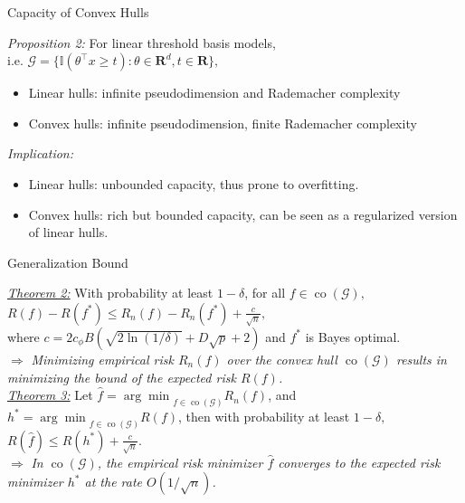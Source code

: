 \documentclass[11pt, xcolor={dvipsnames}]{beamer}
\newcommand{\setG}{{\mathcal G}}
\newcommand{\I}{{\mathbb I}}
\newcommand{\realnum}{{\mathbf R}}
\newcommand{\argmin}{{\arg\min}}
\DeclareMathOperator{\conv}{co}
\begin{document}
\begin{frame}{Capacity of Convex Hulls}

\emph{Proposition 2:} For linear threshold basis models, \\
\hspace{2.5cm}i.e. $ \setG = \{\I(\theta^{\top} x \ge t): \theta \in \realnum^{d}, t \in \realnum\},$
\begin{itemize} 
\item Linear hulls: infinite pseudodimension and Rademacher complexity
\item Convex hulls: infinite pseudodimension, finite Rademacher complexity 
\end{itemize}
\vspace{0.5cm}

\emph{Implication:} 
\begin{itemize} 
\item Linear hulls: unbounded capacity, thus prone to overfitting.
\item Convex hulls: rich but bounded capacity, can be seen as a regularized version of linear hulls.
\end{itemize}

\end{frame}

\begin{frame}{Generalization Bound}

\emph{\underline{Theorem 2:}} 	With probability at least $1 - \delta$, for all $f \in \conv(\setG),$ \\
\hspace{2.5cm}$R(f) - R(f^{*}) \le R_{n} (f) - R_{n}(f^{*}) + \frac{c}{\sqrt{n}},$ \\
where 
$c = {2 c_{\phi} B \left(\sqrt{2 \ln(1/\delta)} + D\sqrt{p} + 2\right)}$ 
and $f^*$ is Bayes optimal.
\vspace{0.2cm}\\
$\Longrightarrow$ \emph{Minimizing empirical risk $R_n(f)$ over the convex hull $\conv(\setG)$ results in minimizing the bound of the expected risk $R(f)$.}
\vspace{0.5cm}\\

\emph{\underline{Theorem 3:}} Let $\hat{f} = \argmin_{f \in \conv(\setG)} R_{n}(f)$, and $h^{*} = \argmin_{f \in \conv(\setG)} R(f)$, 
then with probability at least $1 - \delta,$
\hspace{0.2cm} $R(\hat{f}) \le R(h^{*}) + \frac{c}{\sqrt{n}}.$
\vspace{0.2cm}\\
$\Longrightarrow$ \emph{In $\conv(\setG)$, the empirical risk minimizer $\hat f$ converges to the expected risk minimizer $h^*$ at the rate $O(1/\sqrt n)$.}

\end{frame}
\end{document}
